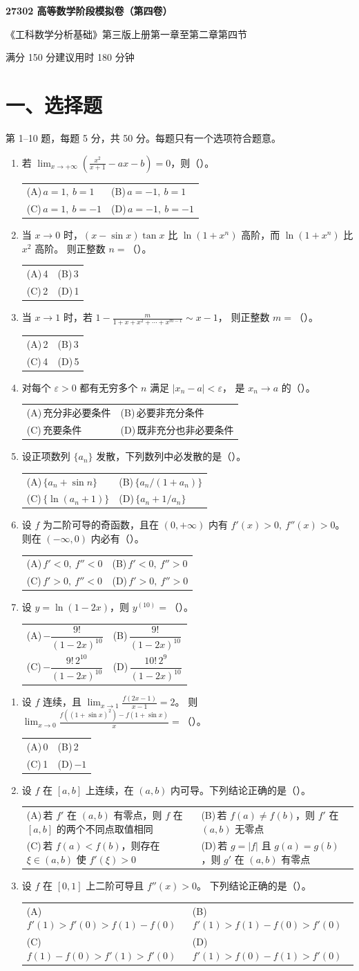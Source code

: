 \documentclass[UTF8,a4paper,zihao=-4,fontset=fandol]{ctexart}
\makeatletter
\newcommand{\choices}[4]{%
  \par\noindent\begin{tabularx}{\linewidth}{@{}X@{\hspace{1em}}X@{}}
    (A)\,#1 & (B)\,#2 \\
    (C)\,#3 & (D)\,#4
  \end{tabularx}\par}
\newcommand{\paper}[1]{%
  \pdfbookmark[0]{第#1卷}{paper.\thepage}%
  \begin{center}
    {\LARGE\bfseries 27302 高等数学阶段模拟卷（第#1卷）\par}
    \small 《工科数学分析基础》第三版上册第一章至第二章第四节\par
    满分 150 分\qquad 建议用时 180 分钟
  \end{center}
  \section*{一、选择题}
  第 1--10 题，每题 5 分，共 50 分。每题只有一个选项符合题意。}
\makeatother
\begin{document}
\newpage
\paper{四}
\begin{enumerate}
\item 若 $\displaystyle\lim_{x\to+\infty}\left(\frac{x^2}{x+1}-ax-b\right)=0$，则（\quad）。
\choices{$a=1,\ b=1$}{$a=-1,\ b=1$}{$a=1,\ b=-1$}{$a=-1,\ b=-1$}
\item 当 $x\to0$ 时，$(x-\sin x)\tan x$ 比 $\ln(1+x^n)$ 高阶，而 $\ln(1+x^n)$ 比 $x^2$ 高阶。
则正整数 $n=$（\quad）。
\choices{4}{3}{2}{1}
\item 当 $x\to1$ 时，若 $\displaystyle 1-\frac{m}{1+x+x^2+\cdots+x^{m-1}}\sim x-1$，
则正整数 $m=$（\quad）。
\choices{2}{3}{4}{5}
\item 对每个 $\varepsilon>0$ 都有无穷多个 $n$ 满足 $|x_n-a|<\varepsilon$，
是 $x_n\to a$ 的（\quad）。
\choices{充分非必要条件}{必要非充分条件}{充要条件}{既非充分也非必要条件}
\item 设正项数列 $\{a_n\}$ 发散，下列数列中必发散的是（\quad）。
\choices{$\{a_n+\sin n\}$}{$\{a_n/(1+a_n)\}$}{$\{\ln(a_n+1)\}$}{$\{a_n+1/a_n\}$}
\item 设 $f$ 为二阶可导的奇函数，且在 $(0,+\infty)$ 内有 $f'(x)>0,\ f''(x)>0$。
则在 $(-\infty,0)$ 内必有（\quad）。
\choices{$f'<0,\ f''<0$}{$f'<0,\ f''>0$}{$f'>0,\ f''<0$}{$f'>0,\ f''>0$}
\item 设 $y=\ln(1-2x)$，则 $y^{(10)}=$（\quad）。
\choices{$-\dfrac{9!}{(1-2x)^{10}}$}{$\dfrac{9!}{(1-2x)^{10}}$}
{$-\dfrac{9!\,2^{10}}{(1-2x)^{10}}$}{$\dfrac{10!\,2^9}{(1-2x)^{10}}$}
\end{enumerate}
\newpage
\begin{enumerate}[start=8]
\item 设 $f$ 连续，且 $\displaystyle\lim_{x\to1}\frac{f(2x-1)}{x-1}=2$。
则 $\displaystyle\lim_{x\to0}\frac{f((1+\sin x)^2)-f(1+\sin x)}{x}=$（\quad）。
\choices{0}{2}{1}{$-1$}
\item 设 $f$ 在 $[a,b]$ 上连续，在 $(a,b)$ 内可导。下列结论正确的是（\quad）。
\choices{若 $f'$ 在 $(a,b)$ 有零点，则 $f$ 在 $[a,b]$ 的两个不同点取值相同}
{若 $f(a)\ne f(b)$，则 $f'$ 在 $(a,b)$ 无零点}
{若 $f(a)<f(b)$，则存在 $\xi\in(a,b)$ 使 $f'(\xi)>0$}
{若 $g=|f|$ 且 $g(a)=g(b)$，则 $g'$ 在 $(a,b)$ 有零点}
\item 设 $f$ 在 $[0,1]$ 上二阶可导且 $f''(x)>0$。
下列结论正确的是（\quad）。
\choices{$f'(1)>f'(0)>f(1)-f(0)$}{$f'(1)>f(1)-f(0)>f'(0)$}
{$f(1)-f(0)>f'(1)>f'(0)$}{$f'(1)>f(0)-f(1)>f'(0)$}
\end{enumerate}
\end{document}
